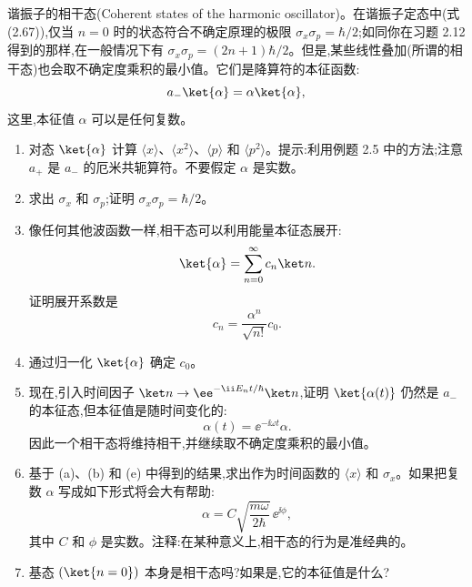 \begin{question}
谐振子的相干态(Coherent states of the harmonic oscillator)。在谐振子定态中(式 (2.67)),仅当 $n=0$ 时的状态符合不确定原理的极限 $\sigma_x\sigma_p=\hbar/2$;如同你在习题 2.12 得到的那样,在一般情况下有 $\sigma_x\sigma_p=(2n+1)\hbar/2$。但是,某些线性叠加(所谓的相干态)也会取不确定度乘积的最小值。它们是降算符的本征函数:
\[
a_-\ket{\alpha}=\alpha\ket{\alpha},
\]
这里,本征值 $\alpha$ 可以是任何复数。
\begin{enumerate}
\item 对态 $\ket{\alpha}$ 计算 $\langle x\rangle$、$\langle x^2\rangle$、$\langle p\rangle$ 和 $\langle p^2\rangle$。提示:利用例题 2.5 中的方法;注意 $a_+$ 是 $a_-$ 的厄米共轭算符。不要假定 $\alpha$ 是实数。
\item 求出 $\sigma_x$ 和 $\sigma_p$;证明 $\sigma_x\sigma_p=\hbar/2$。
\item 像任何其他波函数一样,相干态可以利用能量本征态展开:
\[
\ket{\alpha}=\sum_{n=0}^{\infty}c_n\ket n.
\]
证明展开系数是
\[
c_n=\frac{\alpha^n}{\sqrt{n!}}c_0.
\]
\item 通过归一化 $\ket{\alpha}$ 确定 $c_0$。
\item 现在,引入时间因子 $\ket n\to \mathrm \ee^{-\ii E_nt/\hbar}\ket n$,证明 $\ket{\alpha(t)}$ 仍然是 $a_-$ 的本征态,但本征值是随时间变化的:
\[
\alpha(t)=\mathrm \ee^{-\ii\omega t}\alpha.
\]
因此一个相干态将维持相干,并继续取不确定度乘积的最小值。
\item 基于 (a)、(b) 和 (e) 中得到的结果,求出作为时间函数的 $\langle x\rangle$ 和 $\sigma_x$。如果把复数 $\alpha$ 写成如下形式将会大有帮助:
\[
\alpha=C\sqrt{\frac{m\omega}{2\hbar}}\,\mathrm \ee^{\ii\phi},
\]
其中 $C$ 和 $\phi$ 是实数。注释:在某种意义上,相干态的行为是准经典的。
\item 基态 $(\ket{n=0})$ 本身是相干态吗?如果是,它的本征值是什么?
\end{enumerate}

\par\smallskip
{}

\end{question}
